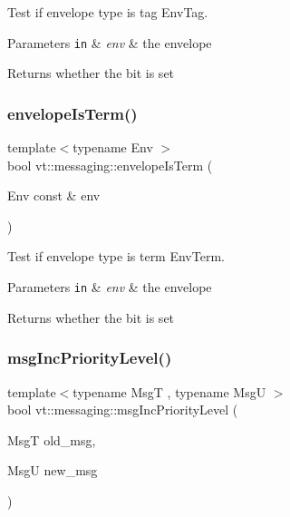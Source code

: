Test if envelope type is tag {\ttfamily Env\+Tag}. 


\begin{DoxyParams}[1]{Parameters}
\mbox{\tt in}  & {\em env} & the envelope\\
\hline
\end{DoxyParams}
\begin{DoxyReturn}{Returns}
whether the bit is set 
\end{DoxyReturn}
\mbox{\label{namespacevt_1_1messaging_ad1743de9163dc74a43e6a95e28f49462}} 
\subsubsection{\texorpdfstring{envelope\+Is\+Term()}{envelopeIsTerm()}}
{\footnotesize\ttfamily template$<$typename Env $>$ \\
bool vt\+::messaging\+::envelope\+Is\+Term (\begin{DoxyParamCaption}\item[{Env const \&}]{env }\end{DoxyParamCaption})\hspace{0.3cm}{\ttfamily [inline]}}



Test if envelope type is term {\ttfamily Env\+Term}. 


\begin{DoxyParams}[1]{Parameters}
\mbox{\tt in}  & {\em env} & the envelope\\
\hline
\end{DoxyParams}
\begin{DoxyReturn}{Returns}
whether the bit is set 
\end{DoxyReturn}
\mbox{\label{namespacevt_1_1messaging_a6ee5ed1aac4e553185dc3fe80544ac2a}} 
\subsubsection{\texorpdfstring{msg\+Inc\+Priority\+Level()}{msgIncPriorityLevel()}}
{\footnotesize\ttfamily template$<$typename MsgT , typename MsgU $>$ \\
bool vt\+::messaging\+::msg\+Inc\+Priority\+Level (\begin{DoxyParamCaption}\item[{MsgT}]{old\+\_\+msg,  }\item[{MsgU}]{new\+\_\+msg }\end{DoxyParamCaption})}

